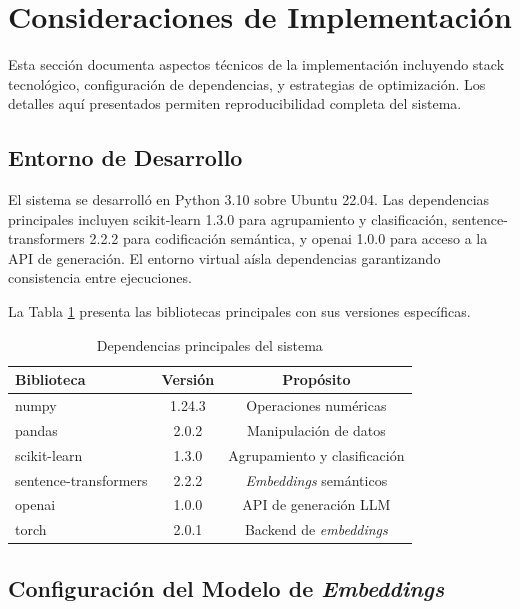 \section{Consideraciones de Implementación}
\label{sec:implementacion}

Esta sección documenta aspectos técnicos de la implementación incluyendo stack tecnológico, configuración de dependencias, y estrategias de optimización. Los detalles aquí presentados permiten reproducibilidad completa del sistema.

\subsection{Entorno de Desarrollo}
\label{subsec:entorno}

El sistema se desarrolló en Python 3.10 sobre Ubuntu 22.04. Las dependencias principales incluyen scikit-learn 1.3.0 para agrupamiento y clasificación, sentence-transformers 2.2.2 para codificación semántica, y openai 1.0.0 para acceso a la API de generación. El entorno virtual aísla dependencias garantizando consistencia entre ejecuciones.

La Tabla \ref{tab:dependencias} presenta las bibliotecas principales con sus versiones específicas.

\begin{table}[h]
\centering
\caption{Dependencias principales del sistema}
\label{tab:dependencias}
\begin{tabular}{lcc}
\hline
Biblioteca & Versión & Propósito \\
\hline
numpy & 1.24.3 & Operaciones numéricas \\
pandas & 2.0.2 & Manipulación de datos \\
scikit-learn & 1.3.0 & Agrupamiento y clasificación \\
sentence-transformers & 2.2.2 & \textit{Embeddings} semánticos \\
openai & 1.0.0 & API de generación LLM \\
torch & 2.0.1 & Backend de \textit{embeddings} \\
\hline
\end{tabular}
\end{table}

\subsection{Configuración del Modelo de \textit{Embeddings}}
\label{subsec:config_embeddings}

